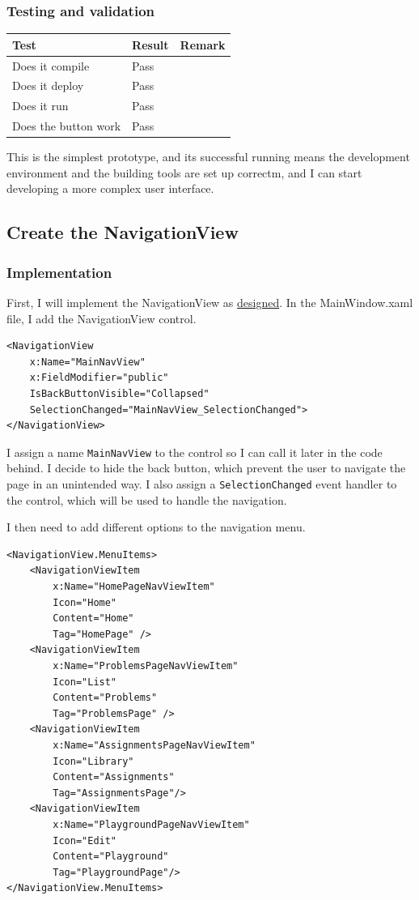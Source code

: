 \documentclass[a4paper]{report}
\begin{document}
\subsubsection{Testing and validation}

\begin{tabulary}{\linewidth}{|L|l|L|}
    \hline
    Test & Result & Remark \\
    \hline
    Does it compile & Pass & \\
    \hline
    Does it deploy & Pass & \\
    \hline
    Does it run & Pass & \\
    \hline
    Does the button work & Pass & \\
    \hline
\end{tabulary}

This is the simplest prototype, and its successful running means the development environment and the building tools are set up correctm, and I can start developing a more complex user interface.

\subsection{Create the NavigationView}

\subsubsection{Implementation}

First, I will implement the NavigationView as \hyperref[sec:NavigationViewDesign]{designed}. In the MainWindow.xaml file, I add the NavigationView control.

\begin{verbatim}
<NavigationView 
    x:Name="MainNavView"
    x:FieldModifier="public"
    IsBackButtonVisible="Collapsed"
    SelectionChanged="MainNavView_SelectionChanged">
</NavigationView>
\end{verbatim}

I assign a name \verb|MainNavView| to the control so I can call it later in the code behind. I decide to hide the back button, which prevent the user to navigate the page in an unintended way. I also assign a \verb|SelectionChanged| event handler to the control, which will be used to handle the navigation.

I then need to add different options to the navigation menu.

\begin{verbatim}
<NavigationView.MenuItems>
    <NavigationViewItem 
        x:Name="HomePageNavViewItem"
        Icon="Home"
        Content="Home"
        Tag="HomePage" />
    <NavigationViewItem
        x:Name="ProblemsPageNavViewItem"
        Icon="List"
        Content="Problems"
        Tag="ProblemsPage" />
    <NavigationViewItem
        x:Name="AssignmentsPageNavViewItem"
        Icon="Library"
        Content="Assignments"
        Tag="AssignmentsPage"/>
    <NavigationViewItem
        x:Name="PlaygroundPageNavViewItem"
        Icon="Edit"
        Content="Playground"
        Tag="PlaygroundPage"/>
</NavigationView.MenuItems>
\end{verbatim}
\end{document}

